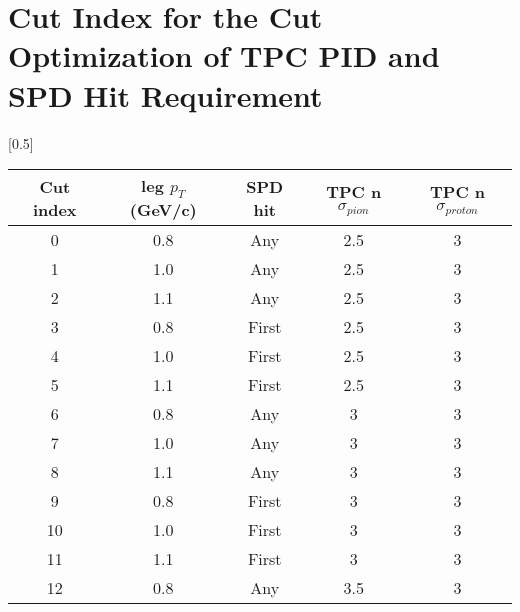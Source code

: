 \chapter{Cut Index for the Cut Optimization of TPC PID and SPD Hit Requirement}
\label{app_b_cutindex}
\begin{table}[H]
  \centering
  \scalebox{0.6}[0.5]{ 
    \begin{tabular}{ccccc} \hline
      Cut index &  leg $p_{T}$(GeV/c)  &  SPD hit & TPC n$\sigma_{pion}$ & TPC n$\sigma_{proton}$ \\ \hline
      0                &  0.8  & Any     &     2.5                           & 3                    \\ 
      1                &  1.0  & Any     &     2.5                           & 3                    \\ 
      2                &  1.1  & Any     &     2.5                           & 3                     \\ 
      3                &  0.8  & First   &     2.5                           & 3                   \\ 
      4                &  1.0  & First   &     2.5                           & 3                   \\ 
      5                &  1.1  & First   &     2.5                           & 3                   \\ 
      6                &  0.8  & Any     &     3                           & 3                    \\ 
      7                &  1.0  & Any     &     3                           & 3                    \\ 
      8                &  1.1  & Any     &     3                           & 3                     \\ 
      9                &  0.8  & First   &     3                           & 3                   \\ 
      10                &  1.0  & First   &     3                           & 3                   \\ 
      11                &  1.1  & First   &     3                           & 3                   \\ 
      12                &  0.8  & Any     &     3.5                           & 3                    \\ 

\end{tabular}}
\end{table}
